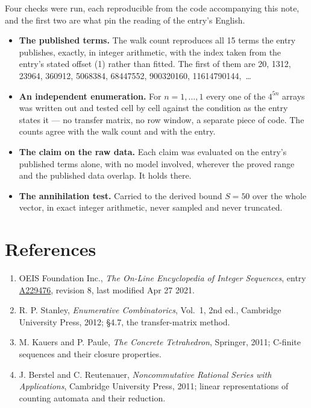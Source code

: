 \documentclass[11pt]{article}
\theoremstyle{definition}
\begin{document}
Four checks were run, each reproducible from the code accompanying this note, and the first two are what pin the reading of the entry's English.

\begin{itemize}

\item {\bfseries The published terms.} The walk count reproduces all 15 terms the entry publishes, exactly, in integer arithmetic, with the index taken from the entry's stated offset (1) rather than fitted. The first of them are 20, 1312, 23964, 360912, 5068384, 68447552, 900320160, 11614790144,~\dots

\item {\bfseries An independent enumeration.} For $n = 1,\dots,1$ every one of the $4^{5n}$ arrays was written out and tested cell by cell against the condition as the entry states it --- no transfer matrix, no row window, a separate piece of code. The counts agree with the walk count and with the entry.

\item {\bfseries The claim on the raw data.} Each claim was evaluated on the entry's published terms alone, with no model involved, wherever the proved range and the published data overlap. It holds there.

\item {\bfseries The annihilation test.} Carried to the derived bound $S = 50$ over the whole vector, in exact integer arithmetic, never sampled and never truncated.

\end{itemize}

\section{References}

\begin{enumerate}

\item OEIS Foundation Inc., \emph{The On-Line Encyclopedia of Integer Sequences}, entry \href{https://oeis.org/A229476}{A229476}, revision 8, last modified Apr 27 2021.

\item R. P. Stanley, \emph{Enumerative Combinatorics}, Vol.~1, 2nd ed., Cambridge University Press, 2012; \S4.7, the transfer-matrix method.

\item M. Kauers and P. Paule, \emph{The Concrete Tetrahedron}, Springer, 2011; C-finite sequences and their closure properties.

\item J. Berstel and C. Reutenauer, \emph{Noncommutative Rational Series with Applications}, Cambridge University Press, 2011; linear representations of counting automata and their reduction.

\end{enumerate}
\end{document}
